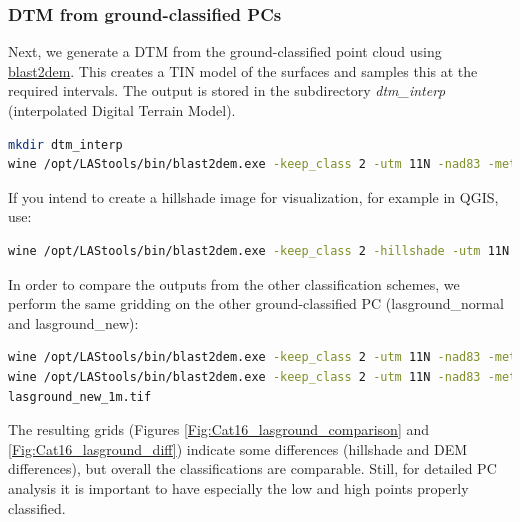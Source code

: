 \documentclass[a4paperpaper,,tablecaptionabove]{scrartcl}
\begin{document}
\hypertarget{dtm-from-ground-classified-pcs}{%
\subsubsection{DTM from ground-classified
PCs}\label{dtm-from-ground-classified-pcs}}

Next, we generate a DTM from the ground-classified point cloud using
\href{https://rapidlasso.com/blast/blast2dem/}{blast2dem}. This creates
a TIN model of the surfaces and samples this at the required intervals.
The output is stored in the subdirectory \emph{dtm\_interp}
(interpolated Digital Terrain Model).

\begin{lstlisting}[language=bash]
mkdir dtm_interp
wine /opt/LAStools/bin/blast2dem.exe -keep_class 2 -utm 11N -nad83 -meter -elevation_meter -merged -step 1 -i Pozo_USGS_UTM11_NAD83_cat16_clg_cl2.laz -o dtm_interp/Pozo_USGS_UTM11_NAD83_cat16_clg_cl2_1m.tif
\end{lstlisting}

If you intend to create a hillshade image for visualization, for example
in QGIS, use:

\begin{lstlisting}[language=bash]
wine /opt/LAStools/bin/blast2dem.exe -keep_class 2 -hillshade -utm 11N -nad83 -meter -elevation_meter -merged -step 1 -i Pozo_USGS_UTM11_NAD83_cat16_clg_cl2.laz -o dtm_interp/Pozo_USGS_UTM11_NAD83_cat16_clg_cl2_1m_HS.tif
\end{lstlisting}

In order to compare the outputs from the other classification schemes,
we perform the same gridding on the other ground-classified PC
(lasground\_normal and lasground\_new):

\begin{lstlisting}[language=bash]
wine /opt/LAStools/bin/blast2dem.exe -keep_class 2 -utm 11N -nad83 -meter -elevation_meter -merged -step 1 -i Pozo_USGS_UTM11_NAD83_cat16_clg_normal.laz -o dtm_interp/Pozo_USGS_UTM11_NAD83_cat16_clg_cl2_normal_1m.tif
wine /opt/LAStools/bin/blast2dem.exe -keep_class 2 -utm 11N -nad83 -meter -elevation_meter -merged -step 1 -i Pozo_USGS_UTM11_NAD83_cat16_clg_lasground_new.laz -o dtm_interp/Pozo_USGS_UTM11_NAD83_cat16_clg_cl2_\
lasground_new_1m.tif
\end{lstlisting}

The resulting grids (Figures \ref{Fig:Cat16_lasground_comparison} and
\ref{Fig:Cat16_lasground_diff}) indicate some differences (hillshade and
DEM differences), but overall the classifications are comparable. Still,
for detailed PC analysis it is important to have especially the low and
high points properly classified.
\end{document}
